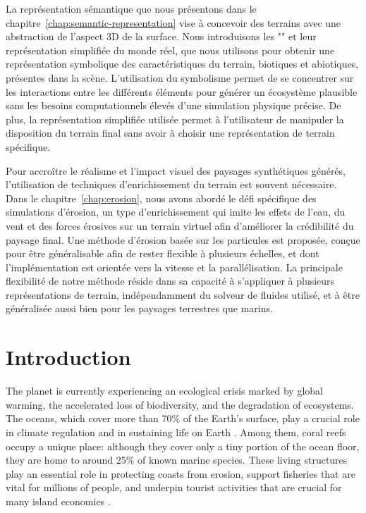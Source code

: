     La représentation sémantique que nous présentons dans le chapitre~\ref{chap:semantic-representation} vise à concevoir des terrains avec une abstraction de l'aspect 3D de la surface. Nous introduisons les "" et leur représentation simplifiée du monde réel, que nous utilisons pour obtenir une représentation symbolique des caractéristiques du terrain, biotiques et abiotiques, présentes dans la scène. L'utilisation du symbolisme permet de se concentrer sur les interactions entre les différents éléments pour générer un écosystème plausible sans les besoins computationnels élevés d'une simulation physique précise. De plus, la représentation simplifiée utilisée permet à l'utilisateur de manipuler la disposition du terrain final sans avoir à choisir une représentation de terrain spécifique.

    Pour accroître le réalisme et l'impact visuel des paysages synthétiques générés, l'utilisation de techniques d'enrichissement du terrain est souvent nécessaire. Dans le chapitre~\ref{chap:erosion}, nous avons abordé le défi spécifique des simulations d'érosion, un type d'enrichissement qui imite les effets de l'eau, du vent et des forces érosives sur un terrain virtuel afin d'améliorer la crédibilité du paysage final. Une méthode d'érosion basée sur les particules est proposée, conçue pour être généralisable afin de rester flexible à plusieurs échelles, et dont l'implémentation est orientée vers la vitesse et la parallélisation. La principale flexibilité de notre méthode réside dans sa capacité à s'appliquer à plusieurs représentations de terrain, indépendamment du solveur de fluides utilisé, et à être généralisée aussi bien pour les paysages terrestres que marins.








\chapter{Introduction}
\label{chap:introduction}
The planet is currently experiencing an ecological crisis marked by global warming, the accelerated loss of biodiversity, and the degradation of ecosystems. The oceans, which cover more than 70\% of the Earth's surface, play a crucial role in climate regulation and in sustaining life on Earth \cite{Pendleton2020,Visbeck2018}. Among them, coral reefs occupy a unique place: although they cover only a tiny portion of the ocean floor, they are home to around 25\% of known marine species. These living structures play an essential role in protecting coasts from erosion, support fisheries that are vital for millions of people, and underpin tourist activities that are crucial for many island economies \cite{Ferrario2014,Spalding2017,Plaisance2011}.

